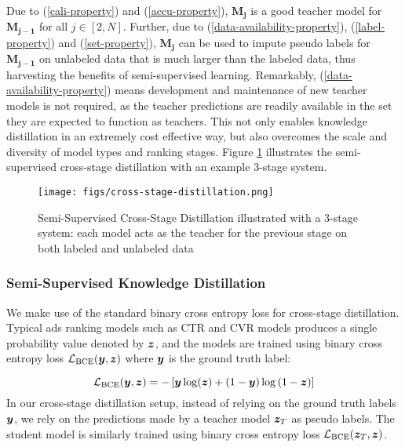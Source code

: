 Due to (\ref{cali-property}) and (\ref{accu-property}), $\mathbf{M_j}$ is a good teacher model for $\mathbf{M_{j-1}}$ for all $j \in [2, N]$. Further, due to (\ref{data-availability-property}), (\ref{label-property}) and (\ref{set-property}), $\mathbf{M_j}$ can be used to impute pseudo labels for $\mathbf{M_{j-1}}$ on unlabeled data that is much larger than the labeled data, thus harvesting the benefits of semi-supervised learning. Remarkably, (\ref{data-availability-property}) means development and maintenance of new teacher models is not required, as the teacher predictions are readily available in the set they are expected to function as teachers. This not only enables knowledge distillation in an extremely cost effective way, but also overcomes the scale and diversity of model types and ranking stages. Figure \ref{fig:cross-stage-distillation} illustrates the semi-supervised cross-stage distillation with an example 3-stage system.

\begin{figure}[t]
  \centering
   \texttt{[image: figs/cross-stage-distillation.png]}
  \caption{Semi-Supervised Cross-Stage Distillation illustrated with a 3-stage system: each model acts as the teacher for the previous stage on both labeled and unlabeled data}
  \label{fig:cross-stage-distillation}
\end{figure}


\subsubsection{Semi-Supervised Knowledge Distillation}
We make use of the standard binary cross entropy loss for cross-stage distillation. Typical ads ranking models such as CTR and CVR models produces a single probability value denoted by ${\bm{z}}$, and the models are trained using binary cross entropy loss $\mathcal{L_{\text{BCE}}}({\bm{y}},{\bm{z}})$ where ${\bm{y}}$ is the ground truth label:

\begin{equation}
\label{eq:bce}
    \mathcal{L_{\text{BCE}}}({\bm{y}},{\bm{z}}) = -\left[{\bm{y}}  \log({{\bm{z}}}) + (1 - {\bm{y}})  \log{(1 - {\bm{z}})}\right]
\end{equation}
In our cross-stage distillation setup, instead of relying on the ground truth labels ${\bm{y}}$, we rely on the predictions made by a teacher model ${\bm{z}}_T$ as pseudo labels. The student model is similarly trained using binary cross entropy loss $ \mathcal{L_{\text{BCE}}}({\bm{z}}_T,{\bm{z}})$. 

